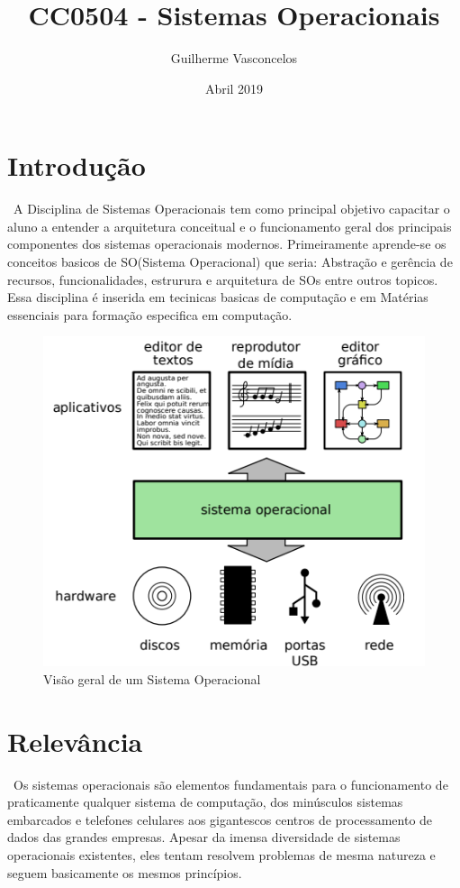 \documentclass[10pt]{article}
\title{CC0504 - Sistemas Operacionais}
\author{Guilherme Vasconcelos}
\date{Abril 2019}
\begin{document}
\maketitle

\section{Introdução}
\ A Disciplina de Sistemas Operacionais tem como principal objetivo capacitar o aluno a entender a arquitetura conceitual e o funcionamento geral dos principais componentes dos sistemas operacionais modernos. Primeiramente aprende-se os conceitos basicos de SO(Sistema Operacional) que seria: Abstração e gerência de recursos, funcionalidades, estrurura e arquitetura de SOs entre outros topicos. Essa disciplina é inserida em tecinicas basicas de computação e em Matérias essenciais para formação especifica em computação.~\cite{einstein}

\begin{figure}[!htb]
    \centering
    \includegraphics[scale=0.7]{visao2.png}
    \caption{Visão geral de um Sistema Operacional}
    \end{figure}
    
\section{Relevância}
\ Os sistemas operacionais são elementos fundamentais para o funcionamento de praticamente qualquer sistema de computação, dos minúsculos sistemas embarcados e telefones celulares aos gigantescos centros de processamento de dados das grandes empresas. Apesar da imensa diversidade de sistemas operacionais existentes, eles tentam resolvem problemas de mesma natureza e seguem basicamente os mesmos princípios.
\end{document}
